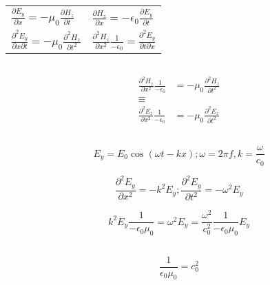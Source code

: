 \documentclass[a4paper,12pt]{article}
\begin{document}
\subsection{}
\begin{table}[h!]
    \centering
    \begin{tabularx}{\textwidth}{YY}
        $\frac{\partial E_y}{\partial x} = -\mu_0 \frac{\partial H_z}{\partial t}$ & $\frac{\partial H_z}{\partial x} = -\epsilon_0 \frac{\partial E_y}{\partial t}$ \\
        $\frac{\partial^2 E_y}{\partial x \partial t} = -\mu_0 \frac{\partial^2 H_z}{\partial t^2}$ & $\frac{\partial^2 H_z}{\partial x^2} \frac{1}{- \epsilon_0} = \frac{\partial^2 E_y}{\partial t \partial x}$ \\
    \end{tabularx}
\end{table}

\subsection{}
\begin{align*}
    \frac{\partial^2 H_z}{\partial x^2} \frac{1}{- \epsilon_0} &= -\mu_0 \frac{\partial^2 H_z}{\partial t^2} \\
    \equiv \\
    \frac{\partial^2 E_z}{\partial x^2} \frac{1}{- \epsilon_0} &= -\mu_0 \frac{\partial^2 E_z}{\partial t^2}
\end{align*}


\subsection{}
\begin{equation}
    E_y = E_0 \cos(\omega t - k x); \omega = 2 \pi f, k = \frac{\omega}{c_0}
\end{equation}

\begin{equation}
    \frac{\partial^2 E_y}{\partial x^2} = -k^2 E_y; \frac{\partial^2 E_y}{\partial t^2} = -\omega^2 E_y
\end{equation}

\begin{equation}
    k^2 E_y \frac{1}{- \epsilon_0 \mu_0} =  \omega^2 E_y = \frac{\omega^2}{c_0^2} \frac{1}{- \epsilon_0 \mu_0} E_y
\end{equation}

\subsection{}
\begin{equation}
    \frac{1}{\epsilon_0 \mu_0} = c_0^2  
\end{equation}
\end{document}

